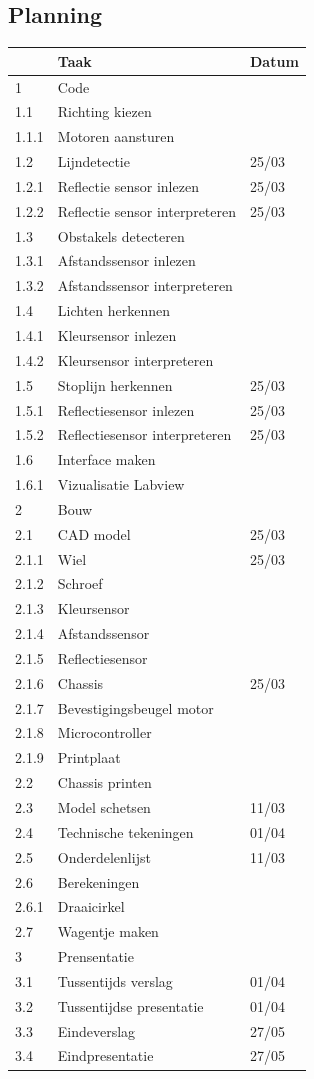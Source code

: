\documentclass[kulak]{kulakarticle} %
\begin{document}
\subsection{Planning}
\begin{tabular}{lll}
	& Taak & Datum \\ \hline
	1 & Code & \\
	1.1 & Richting kiezen & \\
	1.1.1 & Motoren aansturen & \\
	1.2 & Lijndetectie & 25/03 \\
	1.2.1 & Reflectie sensor inlezen & 25/03\\
	1.2.2 & Reflectie sensor interpreteren & 25/03 \\
	1.3 & Obstakels detecteren & \\
	1.3.1 & Afstandssensor inlezen & \\
	1.3.2 & Afstandssensor interpreteren & \\
	1.4 & Lichten herkennen & \\
	1.4.1 & Kleursensor inlezen & \\
	1.4.2 & Kleursensor interpreteren & \\
	1.5 & Stoplijn herkennen & 25/03\\
	1.5.1 & Reflectiesensor inlezen & 25/03\\
	1.5.2 & Reflectiesensor interpreteren & 25/03\\
	1.6 & Interface maken & \\
	1.6.1 & Vizualisatie Labview & \\
	\hline
	2 & Bouw & \\
	2.1 & CAD model & 25/03\\
	2.1.1 & Wiel & 25/03\\
	2.1.2 & Schroef & \\
	2.1.3 & Kleursensor & \\
	2.1.4 & Afstandssensor & \\
	2.1.5 & Reflectiesensor & \\
	2.1.6 & Chassis & 25/03\\
	2.1.7 & Bevestigingsbeugel motor & \\
	2.1.8 & Microcontroller & \\
	2.1.9 & Printplaat & \\
	2.2 & Chassis printen & \\
	2.3 & Model schetsen & 11/03\\
	2.4 & Technische tekeningen & 01/04\\
	2.5 & Onderdelenlijst & 11/03\\
	2.6 & Berekeningen & \\
	2.6.1 & Draaicirkel & \\
	2.7 & Wagentje maken & \\
	\hline
	3 & Prensentatie & \\
	3.1 & Tussentijds verslag & 01/04 \\
	3.2 & Tussentijdse presentatie & 01/04\\
	3.3 & Eindeverslag & 27/05 \\
	3.4 & Eindpresentatie & 27/05\\ \hline
\end{tabular}
\end{document}
